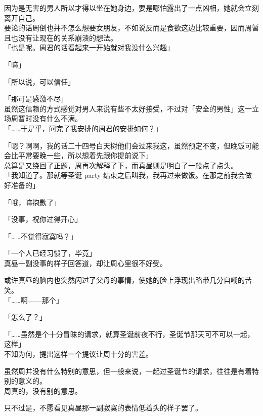 因为是无害的男人所以才得以坐在她身边，要是哪怕露出了一点凶相，她就会立刻离开自己。\\

要论的话周倒也并不怎么想要女朋友，不如说反而是食欲这边比较重要，因而周暂且也没有让现在的关系崩溃的想法。\\

「也是呢。周君的话看起来一开始就对我没什么兴趣」

「嘛」

「所以说，可以信任」

「那可是感激不尽」\\

虽然这信赖的方式感觉对男人来说有些不太好接受，不过对「安全的男性」这一立场周暂时没有什么不满。\\

「……于是乎，问完了我安排的周君的安排如何？」

「嗯？啊啊，我的话二十四号白天树他们会过来我这，虽然预定不变，但晚饭可能会比平常要晚一些，所以想着先跟你提前说下」\\

总算是又绕回了正题，周再次解释了下，而真昼则是明白了一般点了点头。\\

「我知道了。那就等圣诞 party 结束之后叫我，我再过来做饭。在那之前我会做好准备的」

「哦，嘛抱歉了」

「没事，祝你过得开心」

「……不觉得寂寞吗？」

「一个人已经习惯了，毕竟」\\

真昼一副没事的样子回答道，却让周心里很不好受。

或许真昼的脑内也突然闪过了父母的事情，使她的脸上浮现出略带几分自嘲的苦笑。\\

「……啊——那个」

「怎么了？」

「……虽然是个十分冒昧的请求，就算圣诞前夜不行，圣诞节那天可不可以一起，这样」\\

不知为何，提出这样一个提议让周十分的害羞。

虽然周并没有什么特别的意思，但一般来说，一起过圣诞节的请求，往往是有着特别的意义的。\\

周真的，没有别的意思。

只不过是，不愿看见真昼那一副寂寞的表情低着头的样子罢了。\\

